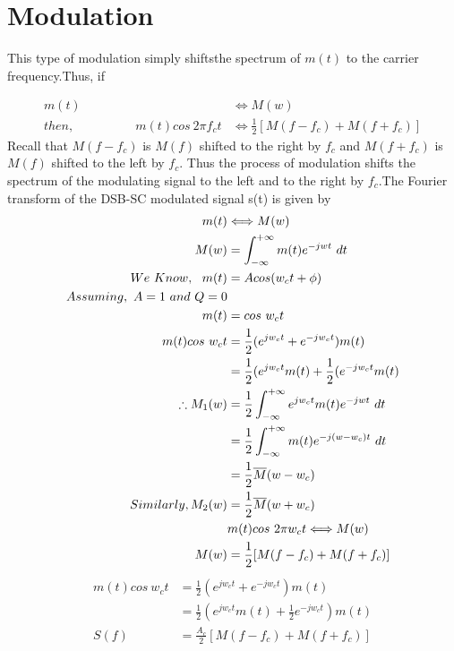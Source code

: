 \section{Modulation}
This type of modulation simply shiftsthe spectrum of $m(t)$ to the carrier frequency.Thus, if

\begin{align}
    m(t) &\Longleftrightarrow M(w) \\
    then, ~~~~~~~~~~~~~~~~~~~~~~ m(t)cos~2\pi f_ct & \Longleftrightarrow \frac{1}{2} [ M(f - f_c ) + M(f + f_c )]
\end{align}
Recall that $M(f-f_c)$ is $M(f)$ shifted to the right by $f_c$ and $M(f+f_c)$ is $M(f)$ shifted to the left by $f_c$. Thus the process of modulation shifts the spectrum of the modulating signal to the left and to the right by $f_c$.The Fourier transform of the DSB-SC modulated signal s(t) is given by
\begin{equation}
  \centering
  \begin{split}
    m(t) &\Longleftrightarrow M(w)\\
    M(w) &= \int_{-\infty}^{+\infty} m(t)e^{-jwt} ~dt\\
    We~Know,~~m(t) &= Acos(w_ct + \phi)\\
    Assuming,~A=1 ~and ~Q=0 \\
    m(t) &= cos~w_ct\\
    m(t)cos~w_ct &= \frac{1}{2}(e^{jw_ct} + e^{-jw_ct})m(t)\\
    &= \frac{1}{2}(e^{jw_ct}m(t) + \frac{1}{2}(e^{-jw_ct}m(t)\\
    \therefore M_1(w) &= \frac{1}{2} \int_{-\infty}^{+\infty} e^{jw_ct}m(t)e^{-jwt} ~dt\\
    &= \frac{1}{2} \int_{-\infty}^{+\infty} m(t)e^{-j(w - w_c)t} ~dt\\
    &= \frac{1}{2} \overline{M}(w-w_c)\\
    Similarly, M_2(w) &= \frac{1}{2} \overline{M}(w+w_c)\\
    &m(t)cos~2\pi w_ct \Longleftrightarrow M(w)\\
    M(w) &= \frac{1}{2} [ M(f - f_c ) + M(f + f_c )]\\
  \end{split}
\end{equation}
\begin{align}
  m(t)cos~w_ct &= \frac{1}{2}(e^{jw_ct} + e^{-jw_ct}) m(t)\\
  &= \frac{1}{2}(e^{jw_ct}m(t) + \frac{1}{2}e^{-jw_ct}) m(t)\\
  S(f) &= \frac{A_c}{2} [ M(f - f_c ) + M(f + f_c )]
\end{align}


